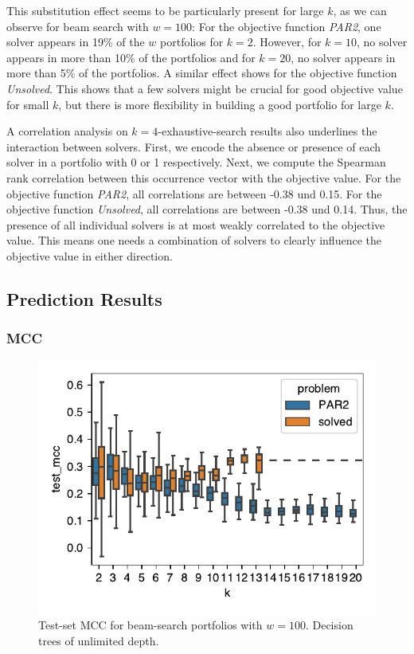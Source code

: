 \documentclass[conference]{IEEEtran}
\begin{document}
This substitution effect seems to be particularly present for large $k$, as we can observe for beam search with $w=100$:
For the objective function \emph{PAR2}, one solver appears in 19\% of the $w$ portfolios for $k=2$.
However, for $k=10$, no solver appears in more than 10\% of the portfolios and for $k=20$, no solver appears in more than 5\% of the portfolios.
A similar effect shows for the objective function \emph{Unsolved}.
This shows that a few solvers might be crucial for good objective value for small $k$, but there is more flexibility in building a good portfolio for large $k$.

A correlation analysis on $k=4$-exhaustive-search results also underlines the interaction between solvers.
First, we encode the absence or presence of each solver in a portfolio with 0 or 1 respectively.
Next, we compute the Spearman rank correlation between this occurrence vector with the objective value.
For the objective function \emph{PAR2}, all correlations are between -0.38 und 0.15.
For the objective function \emph{Unsolved}, all correlations are between -0.38 und 0.14.
Thus, the presence of all individual solvers is at most weakly correlated to the objective value.
This means one needs a combination of solvers to clearly influence the objective value in either direction.

\subsection{Prediction Results}

\subsubsection{MCC}

\begin{figure}[htb]
	\centering
	\includegraphics[width=\columnwidth]{plots/mcc.pdf}
	\caption{Test-set MCC for beam-search portfolios with $w=100$. Decision trees of unlimited depth.}
	\label{fig:mcc}
\end{figure}
\end{document}
